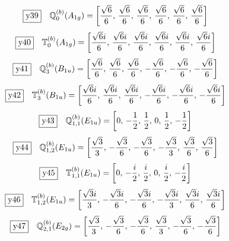 \documentclass[fleqn,10pt,landscape]{jsarticle}
\begin{document}
\begin{dmath*}
\fbox{y39}\quad \mathbb{Q}_{0}^{(b)}(A_{1g})=\left[ \frac{\sqrt{6}}{6},\, \frac{\sqrt{6}}{6},\, \frac{\sqrt{6}}{6},\, \frac{\sqrt{6}}{6},\, \frac{\sqrt{6}}{6},\, \frac{\sqrt{6}}{6} \right]
\end{dmath*}
\begin{dmath*}
\fbox{y40}\quad \mathbb{T}_{0}^{(b)}(A_{1g})=\left[ \frac{\sqrt{6} i}{6},\, \frac{\sqrt{6} i}{6},\, \frac{\sqrt{6} i}{6},\, \frac{\sqrt{6} i}{6},\, \frac{\sqrt{6} i}{6},\, \frac{\sqrt{6} i}{6} \right]
\end{dmath*}
\begin{dmath*}
\fbox{y41}\quad \mathbb{Q}_{3}^{(b)}(B_{1u})=\left[ \frac{\sqrt{6}}{6},\, \frac{\sqrt{6}}{6},\, \frac{\sqrt{6}}{6},\, - \frac{\sqrt{6}}{6},\, - \frac{\sqrt{6}}{6},\, - \frac{\sqrt{6}}{6} \right]
\end{dmath*}
\begin{dmath*}
\fbox{y42}\quad \mathbb{T}_{3}^{(b)}(B_{1u})=\left[ \frac{\sqrt{6} i}{6},\, \frac{\sqrt{6} i}{6},\, \frac{\sqrt{6} i}{6},\, - \frac{\sqrt{6} i}{6},\, - \frac{\sqrt{6} i}{6},\, - \frac{\sqrt{6} i}{6} \right]
\end{dmath*}
\begin{dmath*}
\fbox{y43}\quad \mathbb{Q}_{1,1}^{(b)}(E_{1u})=\left[ 0,\, - \frac{1}{2},\, \frac{1}{2},\, 0,\, \frac{1}{2},\, - \frac{1}{2} \right]
\end{dmath*}
\begin{dmath*}
\fbox{y44}\quad \mathbb{Q}_{1,2}^{(b)}(E_{1u})=\left[ \frac{\sqrt{3}}{3},\, - \frac{\sqrt{3}}{6},\, - \frac{\sqrt{3}}{6},\, - \frac{\sqrt{3}}{3},\, \frac{\sqrt{3}}{6},\, \frac{\sqrt{3}}{6} \right]
\end{dmath*}
\begin{dmath*}
\fbox{y45}\quad \mathbb{T}_{1,1}^{(b)}(E_{1u})=\left[ 0,\, - \frac{i}{2},\, \frac{i}{2},\, 0,\, \frac{i}{2},\, - \frac{i}{2} \right]
\end{dmath*}
\begin{dmath*}
\fbox{y46}\quad \mathbb{T}_{1,2}^{(b)}(E_{1u})=\left[ \frac{\sqrt{3} i}{3},\, - \frac{\sqrt{3} i}{6},\, - \frac{\sqrt{3} i}{6},\, - \frac{\sqrt{3} i}{3},\, \frac{\sqrt{3} i}{6},\, \frac{\sqrt{3} i}{6} \right]
\end{dmath*}
\begin{dmath*}
\fbox{y47}\quad \mathbb{Q}_{2,1}^{(b)}(E_{2g})=\left[ \frac{\sqrt{3}}{3},\, - \frac{\sqrt{3}}{6},\, - \frac{\sqrt{3}}{6},\, \frac{\sqrt{3}}{3},\, - \frac{\sqrt{3}}{6},\, - \frac{\sqrt{3}}{6} \right]
\end{dmath*}
\end{document}
